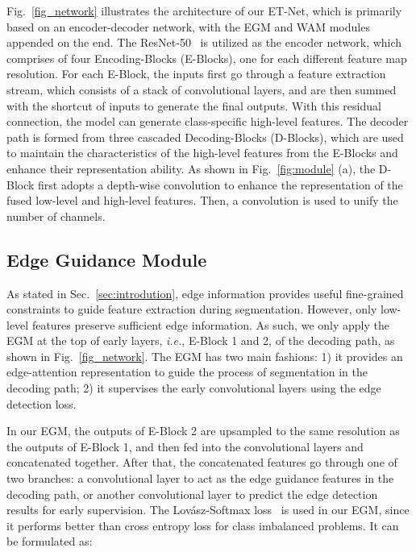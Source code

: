 \documentclass[runningheads,a4paper]{llncs}
\newcommand{\ie}{{\it i.e.}}
\begin{document}
Fig.~\ref{fig_network} illustrates the architecture of our ET-Net, which is primarily based on an encoder-decoder network, with the EGM and WAM modules appended on the end. The ResNet-50~\cite{resnet2016he} is utilized as the encoder network, which comprises of four Encoding-Blocks (E-Blocks), one for each different feature map resolution. For each E-Block, the inputs first go through a feature extraction stream, which consists of a stack of  convolutional layers, and are then summed with the shortcut of inputs to generate the final outputs. With this residual connection, the model can generate class-specific high-level features. The decoder path is formed from three cascaded Decoding-Blocks (D-Blocks), which are used to maintain the characteristics of the high-level features from the E-Blocks and enhance their representation ability. As shown in Fig.~\ref{fig:module} (a), the D-Block first adopts a depth-wise convolution to enhance the representation of the fused low-level and high-level features.  Then, a  convolution is used to unify the number of channels.


\subsection{Edge Guidance Module}
\label{sec:method:EGM}

As stated in Sec.~\ref{sec:introdution}, edge information provides useful fine-grained constraints to guide feature extraction during segmentation. However, only low-level features preserve sufficient edge information. As such, we only apply the EGM at the top of early layers, \ie, E-Block 1 and 2, of the decoding path, as shown in Fig.~\ref{fig_network}.  The EGM has two main fashions: 1) it provides an edge-attention representation to guide the process of segmentation in the decoding path; 2) it supervises the early convolutional layers using the edge detection loss.

In our EGM, the outputs of E-Block 2 are upsampled to the same resolution as the outputs of E-Block 1, and then fed into the  convolutional layers and concatenated together. After that, the concatenated features go through one of two branches: a  convolutional layer to act as the edge guidance features in the decoding path, or another  convolutional layer to predict the edge detection results for early supervision.
The Lov\'{a}sz-Softmax loss~\cite{Berman_2018_CVPR} is used in our EGM, since it performs better than cross entropy loss for class imbalanced problems. It can be formulated as:
\end{document}
